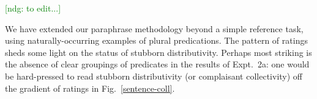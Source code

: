 \documentclass[linguex]{sp}
\newcommand{\ndg}[1]{\textcolor{Green}{[ndg: #1]}}
\begin{document}
\ndg{to edit...}

We have extended our paraphrase methodology beyond a simple reference task, using naturally-occurring examples of plural predications.
The pattern of ratings sheds some light on the status of stubborn distributivity. Perhaps most striking is the absence of clear groupings of predicates in the results of Expt.~2a: one would be hard-pressed to read stubborn distributivity (or complaisant collectivity) off the gradient of ratings in Fig.~\ref{sentence-coll}.



\end{document}
